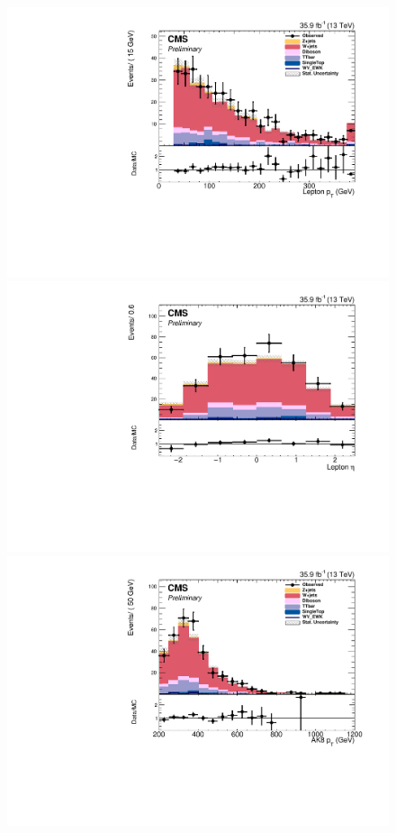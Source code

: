 \begin{figure}[htb]
\centering
\includegraphics[width=\cmsFigWidth]{Plots/plots/DibosonBoostedElMuCuts13TeV_WjetControlRegion_Tighter_CHS_lepton_pt.pdf}
\includegraphics[width=\cmsFigWidth]{Plots/plots/DibosonBoostedElMuCuts13TeV_WjetControlRegion_Tighter_CHS_lepton_eta.pdf}
\includegraphics[width=\cmsFigWidth]{Plots/plots/DibosonBoostedElMuCuts13TeV_WjetControlRegion_Tighter_CHS_ungroomed_PuppiAK8_jet_pt.pdf}

\end{figure}
